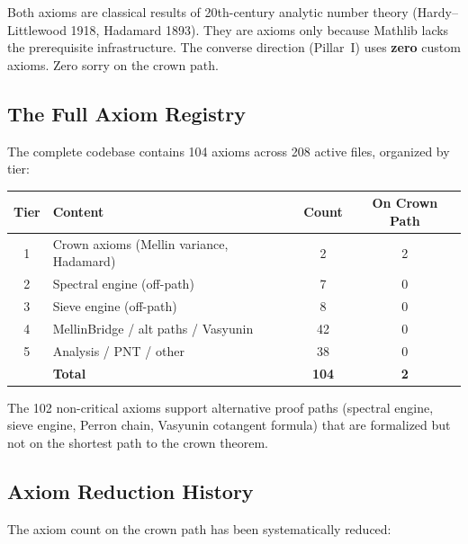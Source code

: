 \documentclass[11pt,a4paper]{article}
\begin{document}
Both axioms are classical results of 20th-century analytic number theory
(Hardy--Littlewood 1918, Hadamard 1893). They are axioms only because
Mathlib lacks the prerequisite infrastructure.
The converse direction (Pillar~I) uses \textbf{zero} custom axioms.
Zero sorry on the crown path.

\subsection{The Full Axiom Registry}

The complete codebase contains 104 axioms across 208 active files,
organized by tier:

\begin{center}
\begin{tabular}{@{}clcc@{}}
\toprule
\textbf{Tier} & \textbf{Content} & \textbf{Count} & \textbf{On Crown Path} \\
\midrule
1 & Crown axioms (Mellin variance, Hadamard) & 2 & 2 \\
2 & Spectral engine (off-path) & 7 & 0 \\
3 & Sieve engine (off-path) & 8 & 0 \\
4 & MellinBridge / alt paths / Vasyunin & 42 & 0 \\
5 & Analysis / PNT / other & 38 & 0 \\
\midrule
& \textbf{Total} & \textbf{104} & \textbf{2} \\
\bottomrule
\end{tabular}
\end{center}

The 102 non-critical axioms support alternative proof paths
(spectral engine, sieve engine, Perron chain, Vasyunin cotangent formula)
that are formalized but not on the shortest path to the crown theorem.

\subsection{Axiom Reduction History}

The axiom count on the crown path has been systematically reduced:
\end{document}
